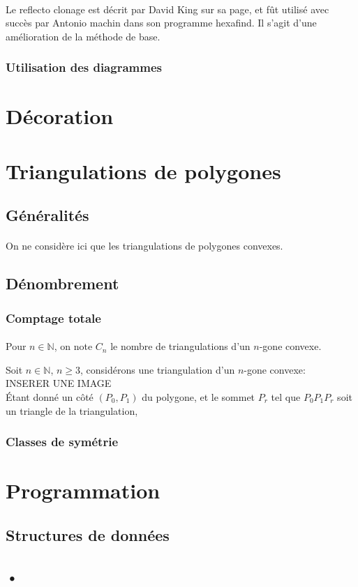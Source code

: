 \documentclass[10pt,a4paper]{article}
\begin{document}
			\paragraph{}Le reflecto clonage est décrit par David King sur sa page, et fût utilisé avec succès par Antonio machin dans son programme hexafind. Il s'agit d'une amélioration de la méthode de base.
			
		\subsubsection{Utilisation des diagrammes}
		
		
	\section{Décoration}
	
	
	
\section{Triangulations de polygones}


	\subsection{Généralités}
		\paragraph{}On ne considère ici que les triangulations de polygones convexes.
		
		
	\subsection{Dénombrement}
	
		\subsubsection{Comptage totale}
			\paragraph{}Pour $n\in\mathbb{N}$, on note $C_{n}$ le nombre de triangulations d'un $n$-gone convexe.
				 
	Soit $n \in \mathbb{N}$, $n \geqslant3$, considérons une triangulation  d'un $n$-gone convexe:
				 \\INSERER UNE IMAGE\\
				 Étant donné un côté $(P_{0},P_{1})$ du polygone, et le sommet $P_{r}$ tel que $P_{0}P_{1}P_{r}$ soit un triangle de la triangulation,
				 

		
		\subsubsection{Classes de symétrie}



\section{Programmation}

	\subsection{Structures de données}
	
	\subsection{•}
\end{document}

